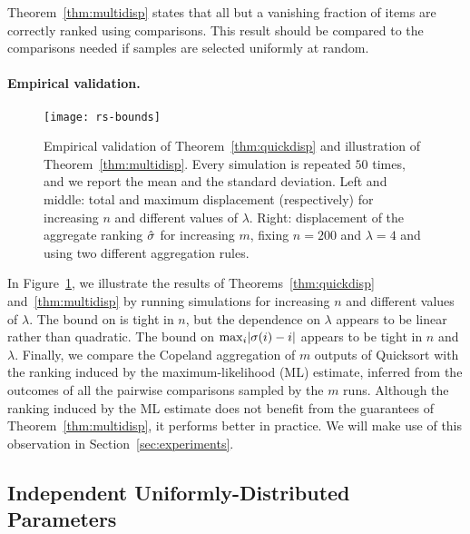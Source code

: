 Theorem~\ref{thm:multidisp} states that all but a vanishing fraction of items are correctly ranked using  comparisons.
This result should be compared to the  comparisons needed if samples are selected uniformly at random.

\paragraph{Empirical validation.}

\begin{figure*}[t]
\centering
\texttt{[image: rs-bounds]}
\caption{
Empirical validation of Theorem~\ref{thm:quickdisp} and illustration of Theorem~\ref{thm:multidisp}.
Every simulation is repeated $50$ times, and we report the mean and the standard deviation.
Left and middle: total and maximum displacement (respectively) for increasing $n$ and different values of $\lambda$.
Right: displacement of the aggregate ranking $\hat{\sigma}$ for increasing $m$, fixing $n = \num{200}$ and $\lambda = \num{4}$ and using two different aggregation rules.
}
\label{fig:bounds}
\end{figure*}

In Figure~\ref{fig:bounds}, we illustrate the results of Theorems~\ref{thm:quickdisp} and~\ref{thm:multidisp} by running simulations for increasing $n$ and different values of $\lambda$.
The bound on \Disp{\sigma} is tight in $n$, but the dependence on $\lambda$ appears to be linear rather than quadratic.
The bound on $\max_i \lvert \sigma(i) - i \rvert$ appears to be tight in $n$ and $\lambda$.
Finally, we compare the Copeland aggregation of $m$ outputs of Quicksort with the ranking induced by the maximum-likelihood (ML) estimate, inferred from the outcomes of all the pairwise comparisons sampled by the $m$ runs.
Although the ranking induced by the ML estimate does not benefit from the guarantees of Theorem~\ref{thm:multidisp}, it performs better in practice.
We will make use of this observation in Section~\ref{sec:experiments}.


\subsection{Independent Uniformly-Distributed Parameters}
\label{sec:iidunif}

